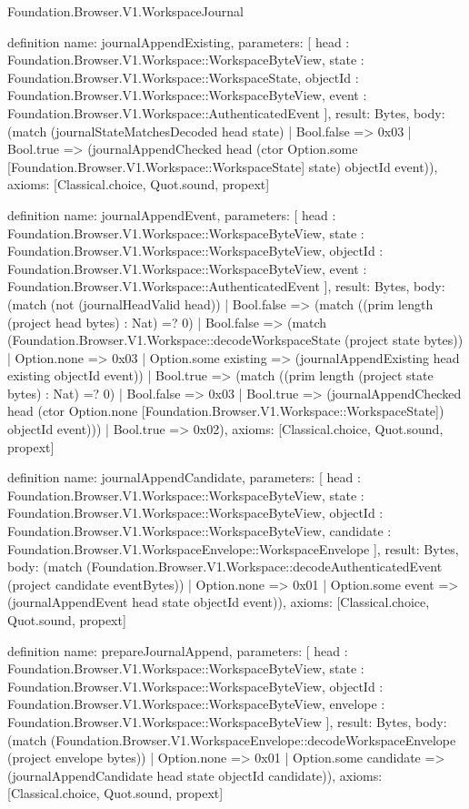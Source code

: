 \begin{lexlean}{Foundation.Browser.V1.WorkspaceJournal}
\begin{semanticmodule}
definition{
  name: journalAppendExisting,
  parameters: [
    head : Foundation.Browser.V1.Workspace::WorkspaceByteView,
    state : Foundation.Browser.V1.Workspace::WorkspaceState,
    objectId : Foundation.Browser.V1.Workspace::WorkspaceByteView,
    event : Foundation.Browser.V1.Workspace::AuthenticatedEvent
  ],
  result: Bytes,
  body: (match (journalStateMatchesDecoded head state)
    | Bool.false => 0x03
    | Bool.true => (journalAppendChecked head (ctor Option.some [Foundation.Browser.V1.Workspace::WorkspaceState] state) objectId event)),
  axioms: [Classical.choice, Quot.sound, propext]
}

definition{
  name: journalAppendEvent,
  parameters: [
    head : Foundation.Browser.V1.Workspace::WorkspaceByteView,
    state : Foundation.Browser.V1.Workspace::WorkspaceByteView,
    objectId : Foundation.Browser.V1.Workspace::WorkspaceByteView,
    event : Foundation.Browser.V1.Workspace::AuthenticatedEvent
  ],
  result: Bytes,
  body: (match (not (journalHeadValid head))
    | Bool.false => (match ((prim length (project head bytes) : Nat) =? 0)
      | Bool.false => (match (Foundation.Browser.V1.Workspace::decodeWorkspaceState (project state bytes))
        | Option.none => 0x03
        | Option.some existing => (journalAppendExisting head existing objectId event))
      | Bool.true => (match ((prim length (project state bytes) : Nat) =? 0)
        | Bool.false => 0x03
        | Bool.true => (journalAppendChecked head (ctor Option.none [Foundation.Browser.V1.Workspace::WorkspaceState]) objectId event)))
    | Bool.true => 0x02),
  axioms: [Classical.choice, Quot.sound, propext]
}

definition{
  name: journalAppendCandidate,
  parameters: [
    head : Foundation.Browser.V1.Workspace::WorkspaceByteView,
    state : Foundation.Browser.V1.Workspace::WorkspaceByteView,
    objectId : Foundation.Browser.V1.Workspace::WorkspaceByteView,
    candidate : Foundation.Browser.V1.WorkspaceEnvelope::WorkspaceEnvelope
  ],
  result: Bytes,
  body: (match (Foundation.Browser.V1.Workspace::decodeAuthenticatedEvent (project candidate eventBytes))
    | Option.none => 0x01
    | Option.some event => (journalAppendEvent head state objectId event)),
  axioms: [Classical.choice, Quot.sound, propext]
}

definition{
  name: prepareJournalAppend,
  parameters: [
    head : Foundation.Browser.V1.Workspace::WorkspaceByteView,
    state : Foundation.Browser.V1.Workspace::WorkspaceByteView,
    objectId : Foundation.Browser.V1.Workspace::WorkspaceByteView,
    envelope : Foundation.Browser.V1.Workspace::WorkspaceByteView
  ],
  result: Bytes,
  body: (match (Foundation.Browser.V1.WorkspaceEnvelope::decodeWorkspaceEnvelope (project envelope bytes))
    | Option.none => 0x01
    | Option.some candidate => (journalAppendCandidate head state objectId candidate)),
  axioms: [Classical.choice, Quot.sound, propext]
}


\end{semanticmodule}
\end{lexlean}
